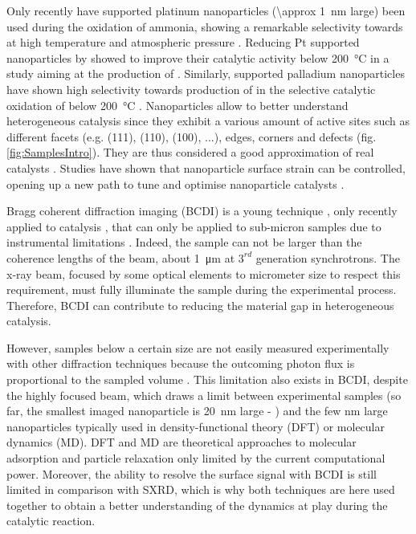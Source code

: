 Only recently have supported platinum nanoparticles (\qty{\approx 1}{\nm} large) been used during the oxidation of ammonia, showing a remarkable selectivity towards  at high temperature and atmospheric pressure \parencite{Schaffer2013}.
Reducing Pt supported nanoparticles by  showed to improve their catalytic activity below \qty{200}{\degreeCelsius} in a study aiming at the production of  \parencite{Svintsitskiy2020}.
Similarly, supported palladium nanoparticles have shown high selectivity towards production of  in the selective catalytic oxidation of  below \qty{200}{\degreeCelsius} \parencite{Dann2019}.
Nanoparticles allow to better understand heterogeneous catalysis since they exhibit a various amount of active sites such as different facets (e.g. (111), (110), (100), ...), edges, corners and defects (fig. \ref{fig:SamplesIntro}).
They are thus considered a good approximation of real catalysts \parencite{Somorjai2007, Molenbroek2009, Cuenya2010, Kwangjin2012, Schauermann2013}.
Studies have shown that nanoparticle surface strain can be controlled, opening up a new path to tune and optimise nanoparticle catalysts \parencite{Zhang2014, Sneed2015, Wang2016}.

Bragg coherent diffraction imaging (BCDI) is a young technique \parencite{Robinson2001}, only recently applied to catalysis \parencite{Ulvestad2016}, that can only be applied to sub-micron samples due to instrumental limitations \parencite{Marchesini2003a}.
Indeed, the sample can not be larger than the coherence lengths of the beam, about \qty{1}{\um} at $3^{rd}$ generation synchrotrons.
The x-ray beam, focused by some optical elements to micrometer size to respect this requirement, must fully illuminate the sample during the experimental process.
Therefore, BCDI can contribute to reducing the material gap in heterogeneous catalysis.

However, samples below a certain size are not easily measured experimentally with other diffraction techniques because the outcoming photon flux is proportional to the sampled volume \parencite{Willmott}.
This limitation also exists in BCDI, despite the highly focused beam, which draws a limit between experimental samples (so far, the smallest imaged nanoparticle is \qty{20}{\nm} large - \cite{Bjorling2019, Carnis2021}) and the few \unit{\nm} large nanoparticles typically used in density-functional theory (DFT) or molecular dynamics (MD).
DFT and MD are theoretical approaches to molecular adsorption and particle relaxation only limited by the current computational power.
Moreover, the ability to resolve the surface signal with BCDI is still limited in comparison with SXRD, which is why both techniques are here used together to obtain a better understanding of the dynamics at play during the catalytic reaction.

